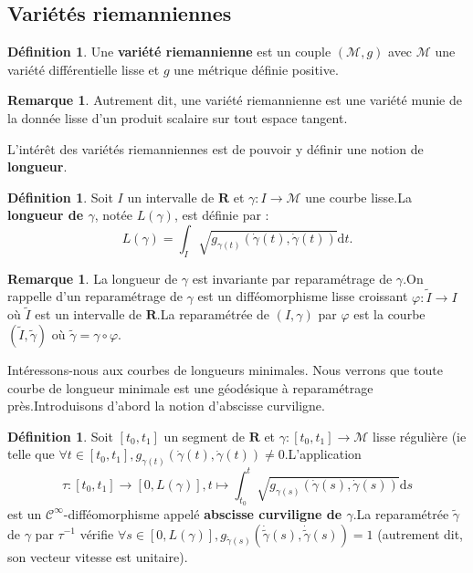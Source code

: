 \documentclass[12pt,a4paper]{article}
\theoremstyle{definition}
\newtheorem{defn}[thm]{Définition}
\newtheorem{rqe}[thm]{Remarque}
\begin{document}
\subsection{Variétés riemanniennes}
\begin{defn}
Une \textbf{variété riemannienne} est un couple $(\mathcal{M},g)$ avec $\mathcal{M}$ une variété différentielle lisse et $g$ une métrique définie positive.
\end{defn}
\begin{rqe}
Autrement dit, une variété riemannienne est une variété munie de la donnée lisse d'un produit scalaire sur tout espace tangent.
\end{rqe}
L'intérêt des variétés riemanniennes est de pouvoir y définir une notion de \textbf{longueur}.
\begin{defn}
Soit $I$ un intervalle de $\mathbf{R}$ et $\gamma:I\to\mathcal{M}$ une courbe lisse.\newline La \textbf{longueur de $\gamma$}, notée $L(\gamma)$, est définie par :
$$L(\gamma)=\int_{I}\sqrt{g_{\gamma(t)}(\dot{\gamma}(t),\dot{\gamma}(t))}\mathrm{d}t.$$
\end{defn}
\begin{rqe}
La longueur de $\gamma$ est invariante par reparamétrage de $\gamma$.\newline On rappelle d'un reparamétrage de $\gamma$ est un difféomorphisme lisse croissant $\varphi:\widetilde{I}\to I$ où $\widetilde{I}$ est un intervalle de $\mathbf{R}$.\newline La reparamétrée de $(I,\gamma)$ par $\varphi$ est la courbe $\left(\widetilde{I},\widetilde{\gamma}\right)$ où $\widetilde{\gamma}=\gamma\circ\varphi$.
\end{rqe}
Intéressons-nous aux courbes de longueurs minimales. Nous verrons que toute courbe de longueur minimale est une géodésique à reparamétrage près.\newline Introduisons d'abord la notion d'abscisse curviligne.
\begin{defn}
Soit $[t_0,t_1]$ un segment de $\mathbf{R}$ et $\gamma:[t_0,t_1]\to\mathcal{M}$ lisse régulière (ie telle que $\forall t\in[t_0,t_1], g_{\gamma(t)}(\dot{\gamma}(t),\dot{\gamma}(t))\neq 0$.\newline L'application $$\displaystyle\tau:[t_0,t_1]\to[0,L(\gamma)],t\mapsto\int_{t_0}^t\sqrt{g_{\gamma(s)}(\dot{\gamma}(s),\dot{\gamma}(s))}\mathrm{d}s$$est un $\mathcal{C}^\infty$-difféomorphisme appelé \textbf{abscisse curviligne de $\gamma$}.\newline La reparamétrée $\widetilde{\gamma}$ de $\gamma$ par $\tau^{-1}$ vérifie $\forall s\in [0,L(\gamma)],g_{\widetilde{\gamma}(s)}(\dot{\widetilde{\gamma}}(s),\dot{\widetilde{\gamma}}(s))=1$ (autrement dit, son vecteur vitesse est unitaire).
\end{defn}
\end{document}
